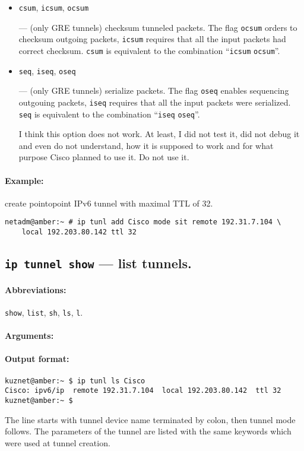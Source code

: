 \begin{itemize}
\item \verb|csum|, \verb|icsum|, \verb|ocsum|

--- (only GRE tunnels) checksum tunneled packets.
   The flag \verb|ocsum| orders to checksum outgoing packets,
   \verb|icsum| requires that all the input packets had correct
   checksum. \verb|csum| is equivalent to the combination
  ``\verb|icsum| \verb|ocsum|''.

\item \verb|seq|, \verb|iseq|, \verb|oseq|

--- (only GRE tunnels) serialize packets.
   The flag \verb|oseq| enables sequencing outgouing packets,
   \verb|iseq| requires that all the input packets were serialized.
   \verb|seq| is equivalent to the combination ``\verb|iseq| \verb|oseq|''.

\begin{NB}
 I think this option does not
	work. At least, I did not test it, did not debug it and
	even do not understand,	how it is supposed to work and for what
	purpose Cisco planned to use it. Do not use it.
\end{NB}


\end{itemize}

\paragraph{Example:} create pointopoint IPv6 tunnel with maximal TTL of 32.
\begin{verbatim}
netadm@amber:~ # ip tunl add Cisco mode sit remote 192.31.7.104 \
    local 192.203.80.142 ttl 32 
\end{verbatim}

\subsection{{\tt ip tunnel show} --- list tunnels.}

\paragraph{Abbreviations:} \verb|show|, \verb|list|, \verb|sh|, \verb|ls|, \verb|l|.


\paragraph{Arguments:}

\paragraph{Output format:}
\begin{verbatim}
kuznet@amber:~ $ ip tunl ls Cisco
Cisco: ipv6/ip  remote 192.31.7.104  local 192.203.80.142  ttl 32 
kuznet@amber:~ $ 
\end{verbatim}
The line starts with tunnel device name terminated by colon,
then tunnel mode follows. The parameters of the tunnel are listed
with the same keywords which were used at tunnel creation.

